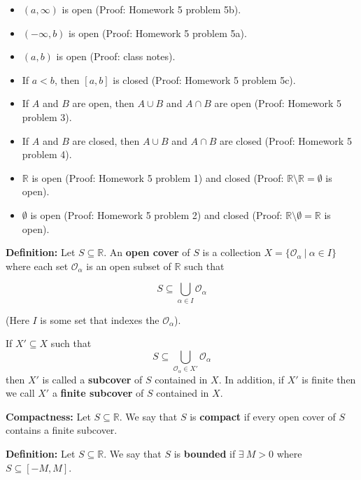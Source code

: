 \documentclass{article}
\begin{document}
\begin{itemize}

\item \((a, \infty)\) is open (Proof: Homework 5 problem 5b).

\item \((-\infty, b)\) is open (Proof: Homework 5 problem 5a).

\item \((a, b)\) is open (Proof: class notes).

\item If \(a < b\), then \([a, b]\) is closed (Proof: Homework 5 problem 5c).

\item If \(A\) and \(B\) are open, then \(A \cup B\) and \(A \cap B\) are open (Proof: Homework 5 problem 3).

\item If \(A\) and \(B\) are closed, then \(A \cup B\) and \(A \cap B\) are closed (Proof: Homework 5 problem 4).

\item \(\mathbb{R}\) is open (Proof: Homework 5 problem 1) and closed (Proof: \(\mathbb{R} \setminus \mathbb{R} = \emptyset\) is open).

\item \(\emptyset\) is open (Proof: Homework 5 problem 2) and closed (Proof: \(\mathbb{R} \setminus \emptyset = \mathbb{R}\) is open).

\end{itemize}

\textbf{Definition:} Let \(S \subseteq \mathbb{R}\). An \textbf{open cover} of \(S\) is a collection \(X = \{\mathcal{O}_\alpha \ | \ \alpha \in I \} \) where each set \(\mathcal{O}_\alpha\) is an open subset of \(\mathbb{R}\) such that

\[
S \subseteq \bigcup_{\alpha \in I} \mathcal{O}_\alpha
\]

(Here \(I\) is some set that indexes the \(\mathcal{O}_\alpha\)).

If \(X' \subseteq X\) such that \[S \subseteq  \bigcup_{\mathcal{O}_\alpha \in X'} \mathcal{O}_\alpha\]then \(X'\) is called a \textbf{subcover} of \(S\) contained in \(X\). In addition, if \(X'\) is finite then we call \(X'\) a \textbf{finite subcover} of \(S\) contained in \(X\).

\textbf{Compactness:} Let \(S \subseteq \mathbb{R}\). We say that \(S\) is \textbf{compact} if every open cover of \(S\) contains a finite subcover. 

\textbf{Definition:} Let \(S \subseteq \mathbb{R}\). We say that \(S\) is \textbf{bounded} if \(\exists \ M > 0\) where \(S \subseteq [-M, M]\).
\end{document}
